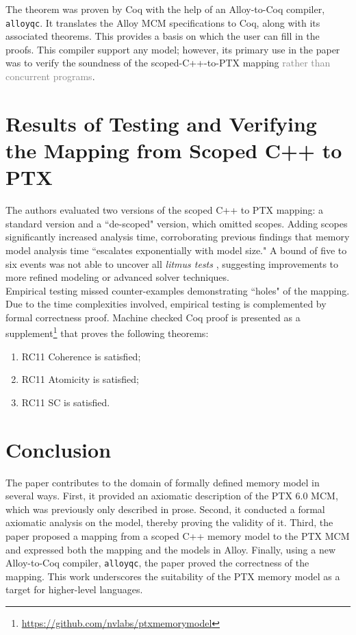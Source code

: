 \documentclass[11pt,a4paper]{article}
\begin{document}
The theorem was proven by Coq \cite{coq} with the help of an Alloy-to-Coq compiler, \verb|alloyqc|. It translates the Alloy MCM specifications to Coq, along with its associated theorems. This provides a basis on which the user can fill in the proofs. This compiler support any model; however, its primary use in the paper was to verify the soundness of the scoped-C++-to-PTX mapping \textcolor{gray}{rather than concurrent programs}.

\section{Results of Testing and Verifying the Mapping from Scoped C++ to PTX}

The authors evaluated two versions of the scoped C++ to PTX mapping: a standard version and a ``de-scoped" version, which omitted scopes. Adding scopes significantly increased analysis time, corroborating previous findings that memory model analysis time ``escalates exponentially with model size." A bound of five to six events was not able to uncover all \textit{litmus tests} \cite{litmus}, suggesting improvements to more refined modeling or advanced solver techniques.\\

Empirical testing missed counter-examples demonstrating ``holes" of the mapping. Due to the time complexities involved, empirical testing is complemented by formal correctness proof. Machine checked Coq proof is presented as a supplement\footnote{\url{https://github.com/nvlabs/ptxmemorymodel}} that proves the following theorems:

\begin{enumerate}
    \item RC11 Coherence is satisfied;
    \item RC11 Atomicity is satisfied;
    \item RC11 SC is satisfied.
\end{enumerate}


\section{Conclusion}

The paper contributes to the domain of formally defined memory model in several ways. First, it provided an axiomatic description of the PTX 6.0 MCM, which was previously only described in prose. Second, it conducted a formal axiomatic analysis on the model, thereby proving the validity of it. Third, the paper proposed a mapping from a scoped C++ memory model to the PTX MCM and expressed both the mapping and the models in Alloy. Finally, using a new Alloy-to-Coq compiler, \verb|alloyqc|, the paper proved the correctness of the mapping. This work underscores the suitability of the PTX memory model as a target for higher-level languages.\\
\end{document}
